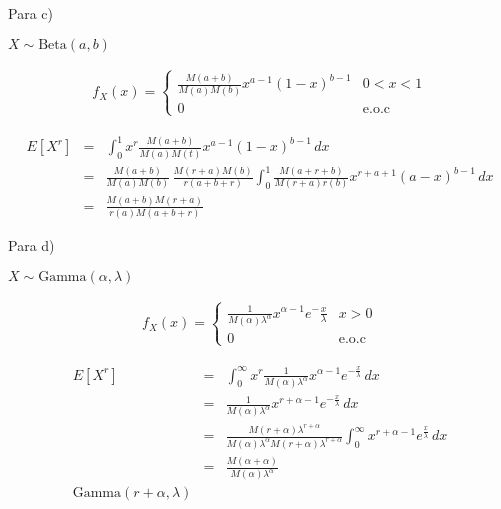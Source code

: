 \begin{enumerate}
Para c) 

\smallskip

$X \sim \textrm{Beta} \left(a,b \right)$


 \begin{eqnarray*}
f_{X} \left(x \right) = \begin{cases}
\frac{M \left(a+b\right)}{M \left(a \right)M \left(b \right)} x^{a-1} \left(1-x \right)^{b-1} & 0<x<1\\
0 &  \textrm{e.o.c}
\end{cases}  
\end{eqnarray*}
 
\begin{eqnarray*}
E \left[X^{r} \right]&=& \int_{0}^{1} x^r \frac{M \left(a+b \right) }{ M \left( a\right) M \left(t \right)  } x^{a-1} \left(1-x \right)^{b-1} \, dx \\
&=& \frac{M \left( a+b \right)}{M \left(a \right) M \left(b \right)} \, \frac{M \left( r+a \right) M \left( b\right) }{r \left( a+b+r \right) } \int_{0}^{1} \frac{M \left(a+r+b \right)}{M \left(r+a \right)r \left(b \right) } x^{r+a+1} \left( a-x\right)^{b-1} \, dx\\
&=& \frac{M \left(a+b \right) M \left(r+a \right) }{r \left(a \right)M \left(a+b+r \right) }
\end{eqnarray*} 
 
Para d) 

\smallskip

$X \sim \textrm{Gamma} \left(\alpha , \lambda \right)$

\begin{eqnarray*}
f_{X} \left(x \right) = \begin{cases}
\frac{1}{M \left(\alpha \right) \lambda^{ \alpha }} x^{\alpha -1 }e^-{\frac{x}{\lambda }}  & x>0\\
0 &  \textrm{e.o.c}
\end{cases}  
\end{eqnarray*}


 \begin{eqnarray*}
E \left[X ^r \right] &=& \int_{0}^{ \infty } x^r \frac{1}{M \left(\alpha \right)\lambda^{ \alpha} } x^{\alpha - 1} e^{- \frac{x}{\lambda } }\, dx\\
&=& \frac{1}{M \left( \alpha \right)  \lambda ^\alpha  } x^{r+ \alpha-1 } e^{- \frac{x}{\lambda} } \, dx\\
&=& \frac{M \left( r+ \alpha \right) \lambda^{r+\alpha}} {M \left(\alpha\right) \lambda ^{ \alpha } M \left(r+\alpha \right) \lambda^{r+\alpha} } \int _{0}^{ \infty } x^{r+ \alpha -1 }   e^{\frac{x}{\lambda } } \, dx\\
&=& \frac{M \left(\alpha + \alpha \right) }{ M \left(\alpha \right) \lambda^{ \alpha } }\\
\textrm{Gamma} \left(r+\alpha, \lambda \right)
\end{eqnarray*}


\end{enumerate}
